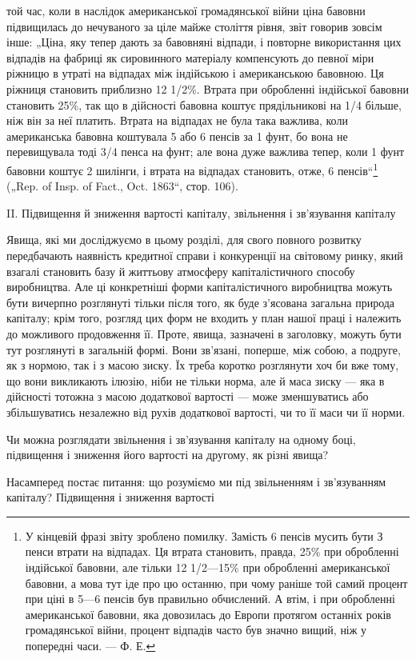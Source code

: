 той час, коли в наслідок американської громадянської війни ціна
бавовни підвищилась до нечуваного за ціле майже століття
рівня, звіт говорив зовсім інше: „Ціна, яку тепер дають за бавовняні
відпади, і повторне використання цих відпадів на
фабриці як сировинного матеріалу компенсують до певної міри
ріжницю в утраті на відпадах між індійською і американською
бавовною. Ця ріжниця становить приблизно 12 1/2\%. Втрата при
обробленні індійської бавовни становить 25\%, так що в дійсності
бавовна коштує прядільникові на 1/4 більше, ніж він за неї
платить. Втрата на відпадах не була така важлива, коли американська
бавовна коштувала 5 або 6 пенсів за 1 фунт, бо вона
не перевищувала тоді 3/4 пенса на фунт; але вона дуже важлива
тепер, коли 1 фунт бавовни коштує 2 шилінги, і втрата на відпадах
становить, отже, 6 пенсів“\footnote{
У кінцевій фразі звіту зроблено помилку. Замість 6 пенсів мусить бути З
пенси втрати на відпадах. Ця втрата становить, правда, 25\% при обробленні
індійської бавовни, але тільки 12 1/2—15\% при обробленні американської бавовни,
а мова тут іде про цю останню, при чому раніше той самий процент при
ціні в 5—6 пенсів був правильно обчислений. А втім, і при обробленні американської
бавовни, яка довозилась до Европи протягом останніх років громадянської
війни, процент відпадів часто був значно вищий, ніж у попередні
часи. — Ф. Е.
} („Rep. of Insp. of Fact., Oct.
1863“, стор. 106).

II. Підвищення й зниження вартості капіталу, звільнення
і зв’язування капіталу

Явища, які ми досліджуємо в цьому розділі, для свого повного
розвитку передбачають наявність кредитної справи і конкуренції
на світовому ринку, який взагалі становить базу й життьову атмосферу
капіталістичного способу виробництва. Але ці конкретніші
форми капіталістичного виробництва можуть бути вичерпно розглянуті
тільки після того, як буде з’ясована загальна природа
капіталу; крім того, розгляд цих форм не входить у план нашої
праці і належить до можливого продовження її. Проте, явища,
зазначені в заголовку, можуть бути тут розглянуті в загальній
формі. Вони зв’язані, поперше, між собою, а подруге, як
з нормою, так і з масою зиску. Їх треба коротко розглянути
хоч би вже тому, що вони викликають ілюзію, ніби не тільки
норма, але й маса зиску — яка в дійсності тотожна з масою
додаткової вартості — може зменшуватись або збільшуватись
незалежно від рухів додаткової вартості, чи то її маси чи її
норми.

Чи можна розглядати звільнення і зв’язування капіталу на
одному боці, підвищення і зниження його вартості на другому,
як різні явища?

Насамперед постає питання: що розуміємо ми під звільненням
і зв’язуванням капіталу? Підвищення і зниження вартості